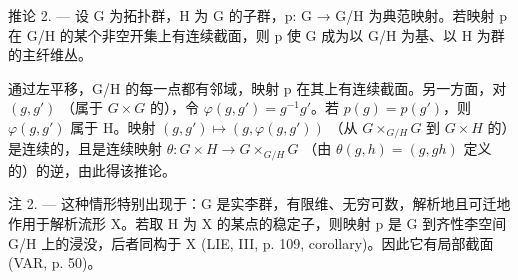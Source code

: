 推论 2. --- 设 G 为拓扑群，H 为 G 的子群，p: G → G/H 为典范映射。若映射 p 在 G/H 的某个非空开集上有连续截面，则 p 使 G 成为以 G/H 为基、以 H 为群的主纤维丛。

通过左平移，G/H 的每一点都有邻域，映射 p 在其上有连续截面。另一方面，对 \((g,g')\) （属于 \(G\times G\) 的），令 \(\varphi(g,g')=g^{-1}g'\)。若 \(p(g)=p(g')\)，则 \(\varphi(g,g')\) 属于 H。映射 \((g,g')\mapsto(g,\varphi(g,g'))\) （从 \(G\times_{G/H}G\) 到 \(G\times H\) 的）是连续的，且是连续映射 \(\theta: G\times H\to G\times_{G/H}G\) （由 \(\theta(g,h)=(g,gh)\) 定义的）的逆，由此得该推论。

注 2. --- 这种情形特别出现于：G 是实李群，有限维、无穷可数，解析地且可迁地作用于解析流形 X。若取 H 为 X 的某点的稳定子，则映射 p 是 G 到齐性李空间 G/H 上的浸没，后者同构于 X (LIE, III, p. 109, corollary)。因此它有局部截面 (VAR, p. 50)。
\relax{}
